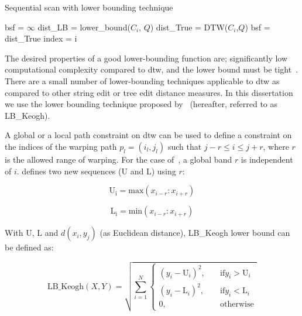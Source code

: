\begin{algorithm}
	\caption{Sequential scan with lower bounding technique}
	\label{alg:sequential_scan_lower_bound}
	\begin{algorithmic}
		\State bsf = $\infty$	
			\State dist\_LB = lower\_bound($C_i$, $Q$)
				\State dist\_True = DTW($C_i$,$Q$)	
					\State bsf = dist\_True
					\State index = i 
				\EndIf
			\EndIf
		
		\EndFor
		
	\end{algorithmic}
\end{algorithm}

The desired properties of a good lower-bounding function are; significantly low computational complexity compared to \gls{dtw}, and the lower bound must be tight~\citep{Keogh2004}. There are a small number of lower-bounding techniques applicable to \gls{dtw} as compared to other string edit or tree edit distance measures. In this dissertation we use the lower bounding technique proposed by~\cite{Keogh2004} (hereafter, referred to as LB\_Keogh). 

A global or a local path constraint on \gls{dtw} can be used to define a constraint on the indices of the warping path $p_l = (i_l, j_l)$ such that $j-r \leq i \leq j+r$, where $r$ is the allowed range of warping. For the case of~\citep{Sakoe78TASLP}, a global band $r$ is independent of $i$. \cite{Keogh2004} defines two new sequences ($\mathrm{U}$ and $\mathrm{L}$) using $r$:

\begin{equation}
	\mathrm{U_i} = \mathrm{max}(x_{i-r}:x_{i+r})
\end{equation}

\begin{equation}
\mathrm{\mathrm{L}_i} = \mathrm{min}(x_{i-r}:x_{i+r})
\end{equation}

With $\mathrm{U}$, $\mathrm{L}$ and $d(x_i, y_j)$ (as Euclidean distance), LB\_Keogh lower bound can be defined as:

\begin{equation}
	\mathrm{LB\_Keogh}(X,Y) = \sqrt{\sum_{i=1}^{N}{\begin{cases}
			(y_i - \mathrm{U}_i)^2, & \quad \text{if} y_i > \mathrm{U}_i\\
			(y_i - \mathrm{L}_i)^2, & \quad \text{if} y_i < \mathrm{L}_i\\			
			0, & \quad \mathrm{otherwise}			
			\end{cases}}}
\end{equation}


